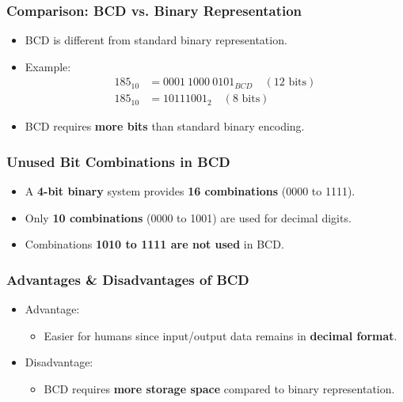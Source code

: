 \documentclass[a4paper,12pt]{article}
\begin{document}
\subsubsection{Comparison: BCD vs. Binary Representation}
\begin{itemize}
    \item BCD is different from standard binary representation.
    \item Example:
    \begin{align*}
        185_{10} &= 0001\ 1000\ 0101_{BCD} \quad (12\text{ bits})\\
        185_{10} &= 10111001_2 \quad (8\text{ bits})
    \end{align*}
    \item BCD requires \textbf{more bits} than standard binary encoding.
\end{itemize}

\subsubsection{Unused Bit Combinations in BCD}
\begin{itemize}
    \item A \textbf{4-bit binary} system provides \textbf{16 combinations} (0000 to 1111).
    \item Only \textbf{10 combinations} (0000 to 1001) are used for decimal digits.
    \item Combinations \textbf{1010 to 1111 are not used} in BCD.
\end{itemize}

\subsubsection{Advantages \& Disadvantages of BCD}
\begin{itemize}
\item {Advantage:}
\begin{itemize}
    \item Easier for humans since input/output data remains in \textbf{decimal format}.
\end{itemize}
\item{Disadvantage:}
\begin{itemize}
    \item BCD requires \textbf{more storage space} compared to binary representation.
\end{itemize}
\end{itemize}
\end{document}
